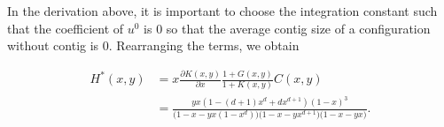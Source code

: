 \documentclass{article}
\begin{document}
In the derivation above, it is important to choose the integration
constant such that the coefficient of $u^0$ is $0$ so that the average
contig size of a configuration without contig is $0$. Rearranging the
terms, we obtain

\begin{equation*}
\begin{split}
H^*(x,y) &= x \frac{\partial K(x,y)}{\partial x}
\frac{1+G(x,y)}{1+K(x,y)}C(x,y) \\
&= \frac{yx(1-(d+1)x^d+dx^{d+1})(1-x)^3}
{\big(1-x-yx(1-x^d)\big)\big(1-x-yx^{d+1}\big)\big(1-x-yx\big)}.
\end{split}
\end{equation*}



%
%
%
%
%
%
%
\end{document}
